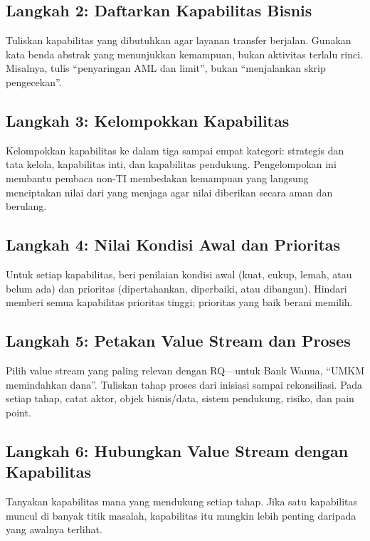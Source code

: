 \subsection{Langkah 2: Daftarkan Kapabilitas Bisnis}

Tuliskan kapabilitas yang dibutuhkan agar layanan transfer berjalan. Gunakan
kata benda abstrak yang menunjukkan kemampuan, bukan aktivitas terlalu rinci.
Misalnya, tulis ``penyaringan AML dan limit'', bukan ``menjalankan skrip
pengecekan''.

\subsection{Langkah 3: Kelompokkan Kapabilitas}

Kelompokkan kapabilitas ke dalam tiga sampai empat kategori: strategis dan tata
kelola, kapabilitas inti, dan kapabilitas pendukung. Pengelompokan ini membantu
pembaca non-TI membedakan kemampuan yang langsung menciptakan nilai dari yang
menjaga agar nilai diberikan secara aman dan berulang.

\subsection{Langkah 4: Nilai Kondisi Awal dan Prioritas}

Untuk setiap kapabilitas, beri penilaian kondisi awal (kuat, cukup, lemah, atau
belum ada) dan prioritas (dipertahankan, diperbaiki, atau dibangun). Hindari
memberi semua kapabilitas prioritas tinggi; prioritas yang baik berani memilih.

\subsection{Langkah 5: Petakan Value Stream dan Proses}

Pilih value stream yang paling relevan dengan RQ---untuk Bank Wanua, ``UMKM
memindahkan dana''. Tuliskan tahap proses dari inisiasi sampai rekonsiliasi.
Pada setiap tahap, catat aktor, objek bisnis/data, sistem pendukung, risiko, dan
pain point.

\subsection{Langkah 6: Hubungkan Value Stream dengan Kapabilitas}

Tanyakan kapabilitas mana yang mendukung setiap tahap. Jika satu kapabilitas
muncul di banyak titik masalah, kapabilitas itu mungkin lebih penting daripada
yang awalnya terlihat.

